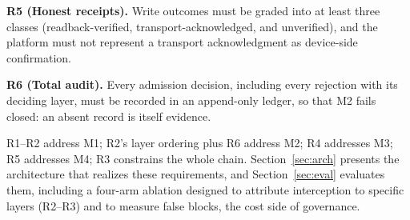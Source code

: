 \textbf{R5 (Honest receipts).} Write outcomes must be graded into at least
three classes (readback-verified, transport-acknowledged, and unverified),
and the platform must not represent a transport acknowledgment as
device-side confirmation.

\textbf{R6 (Total audit).} Every admission decision, including every
rejection with its deciding layer, must be recorded in an append-only
ledger, so that M2 fails closed: an absent record is itself evidence.

R1--R2 address M1; R2's layer ordering plus R6 address M2; R4 addresses M3;
R5 addresses M4; R3 constrains the whole chain. Section~\ref{sec:arch}
presents the architecture that realizes these requirements, and
Section~\ref{sec:eval} evaluates them, including a four-arm ablation
designed to attribute interception to specific layers (R2--R3) and to
measure false blocks, the cost side of governance.
